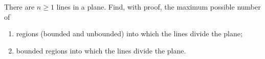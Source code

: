 There are $n\ge1$ lines in a plane. Find, with proof, the maximum possible number of
\begin{enumerate}
\item[(i)] regions (bounded and unbounded) into which the lines divide the plane;
\item[(ii)] bounded regions into which the lines divide the plane.
\end{enumerate}
